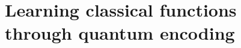 \documentclass[11pt]{article}
\newcommand{\B}{\ensuremath{\mathcal{B}}}
\newcommand{\A}{\ensuremath{\mathcal{A}}}
\newcommand{\Tr}{\textsf{Tr}}
\newcommand{\calA}{{\cal A }}
\begin{document}





\section{Learning classical functions through quantum encoding}
\label{sec:classicalfunctionlearning}
\end{document}
